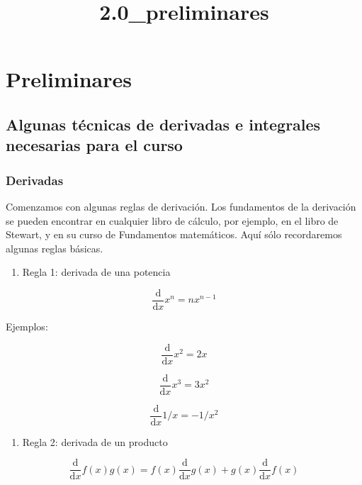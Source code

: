 \documentclass[11pt]{article}
\title{2.0\_preliminares}
\providecommand{\tightlist}{%
      \setlength{\itemsep}{0pt}\setlength{\parskip}{0pt}}
\begin{document}
    
    \maketitle
    
    

    
    \hypertarget{preliminares}{%
\section{Preliminares}\label{preliminares}}

\hypertarget{algunas-tuxe9cnicas-de-derivadas-e-integrales-necesarias-para-el-curso}{%
\subsection{Algunas técnicas de derivadas e integrales necesarias para
el
curso}\label{algunas-tuxe9cnicas-de-derivadas-e-integrales-necesarias-para-el-curso}}

\hypertarget{derivadas}{%
\subsubsection{Derivadas}\label{derivadas}}

Comenzamos con algunas reglas de derivación. Los fundamentos de la
derivación se pueden encontrar en cualquier libro de cálculo, por
ejemplo, en el libro de Stewart, y en su curso de Fundamentos
matemáticos. Aquí sólo recordaremos algunas reglas básicas.

\begin{enumerate}
\def\labelenumi{\arabic{enumi}.}
\tightlist
\item
  Regla 1: derivada de una potencia
\end{enumerate}

\[\frac{\text{d}}{\text{d}x} x^n = n x^{n-1}\]

Ejemplos:

\[\frac{\text{d}}{\text{d}x} x^2 = 2x\]

\[\frac{\text{d}}{\text{d}x} x^3 = 3x^2\]

\[\frac{\text{d}}{\text{d}x} 1/x = -1/x^2\]

\begin{enumerate}
\def\labelenumi{\arabic{enumi}.}
\setcounter{enumi}{1}
\tightlist
\item
  Regla 2: derivada de un producto
\end{enumerate}

\[\frac{\text{d}}{\text{d}x} f(x) g(x) = f(x) \frac{\text{d}}{\text{d}x} g(x) + g(x) \frac{\text{d}}{\text{d}x} f(x)\]
\end{document}
